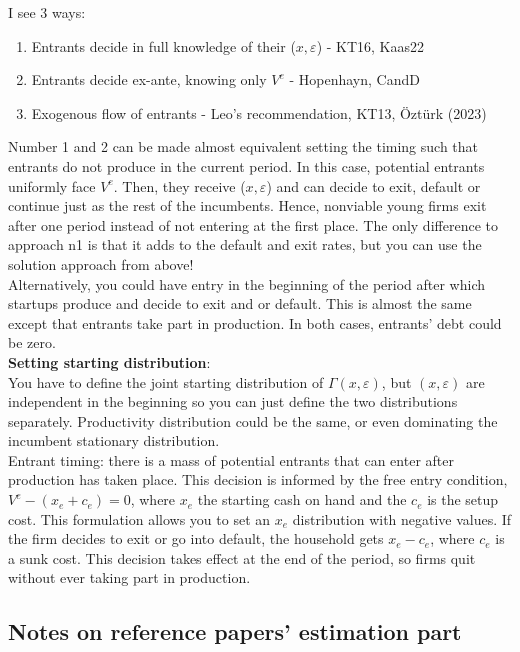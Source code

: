 \documentclass[12pt]{article}
\begin{document}
I see 3 ways:
\begin{enumerate} \setlength\itemsep{0em}
    \item Entrants decide in full knowledge of their ($x, \varepsilon$) - KT16, Kaas22
    \item Entrants decide ex-ante, knowing only $V^e$ - Hopenhayn, CandD
    \item Exogenous flow of entrants - Leo's recommendation, KT13, Öztürk (2023)
\end{enumerate}
Number 1 and 2 can be made almost equivalent setting the timing such that entrants do not produce in the current period. In this case, potential entrants uniformly face $V^e$. Then, they receive ($x, \varepsilon$) and can decide to exit, default or continue just as the rest of the incumbents. Hence, nonviable young firms exit after one period instead of not entering at the first place. The only difference to approach n1 is that it adds to the default and exit rates, but you can use the solution approach from above! \vspace{3mm} \\
Alternatively, you could have entry in the beginning of the period after which startups produce and decide to exit and or default. This is almost the same except that entrants take part in production. In both cases, entrants' debt could be zero. \vspace{3mm} \\
\textbf{Setting starting distribution}: \\
You have to define the joint starting distribution of $\Gamma(x,\varepsilon)$, but $(x,\varepsilon)$ are independent in the beginning so you can just define the two distributions separately. Productivity distribution could be the same, or even dominating the incumbent stationary distribution. \vspace{3mm} \\
Entrant timing: there is a mass of potential entrants that can enter after production has taken place. This decision is informed by the free entry condition, $V^e - (x_e + c_e) = 0$, where $x_e$ the starting cash on hand and the $c_e$ is the setup cost. This formulation allows you to set an $x_e$ distribution with negative values. If the firm decides to exit or go into default, the household gets $x_e - c_e$, where $c_e$ is a sunk cost. This decision takes effect at the end of the period, so firms quit without ever taking part in production.
\newpage
\subsection*{Notes on reference papers' estimation part}
\end{document}
